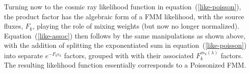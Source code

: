 Turning now to the cosmic ray likelihood function in
equation~(\ref{like-poisson}), the product factor has the algebraic form of
a FMM likelihood, with the source fluxes, $F_k$, playing the role of
mixing weights (but now no longer normalized).  Equation~(\ref{like-assoc})
then follows by the same manipulations as shown above, with the
addition of splitting the exponentiated sum in equation~(\ref{like-poisson})
into separate $e^{-F_k\epsilon_k}$ factors, grouped with with their
associated $F_k^{m_k(\lambda)}$ factors.  The resulting likelihood
function essentially corresponds to a Poissonized FMM.

